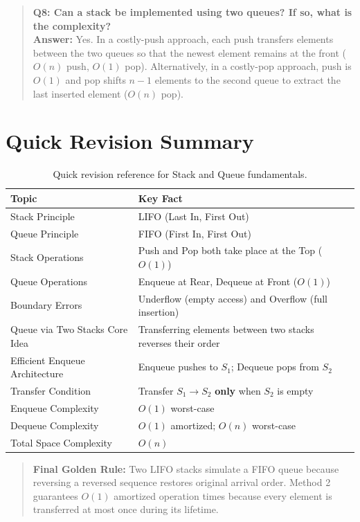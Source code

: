 \begin{quote}
\textbf{Q8: Can a stack be implemented using two queues? If so, what is the complexity?}\\
\textbf{Answer:} Yes. In a costly-push approach, each push transfers elements between the two queues so that the newest element remains at the front ($O(n)$ push, $O(1)$ pop). Alternatively, in a costly-pop approach, push is $O(1)$ and pop shifts $n-1$ elements to the second queue to extract the last inserted element ($O(n)$ pop).
\end{quote}

\section{Quick Revision Summary}

\begin{table}[htbp]
\centering
\small
\begin{tabularx}{\textwidth}{l X}
\toprule
\textbf{Topic} & \textbf{Key Fact} \\
\midrule
Stack Principle                & LIFO (Last In, First Out) \\
Queue Principle                & FIFO (First In, First Out) \\
Stack Operations               & Push and Pop both take place at the Top ($O(1)$) \\
Queue Operations               & Enqueue at Rear, Dequeue at Front ($O(1)$) \\
Boundary Errors                & Underflow (empty access) and Overflow (full insertion) \\
Queue via Two Stacks Core Idea & Transferring elements between two stacks reverses their order \\
Efficient Enqueue Architecture & Enqueue pushes to $S_1$; Dequeue pops from $S_2$ \\
Transfer Condition             & Transfer $S_1 \to S_2$ \textbf{only} when $S_2$ is empty \\
Enqueue Complexity             & $O(1)$ worst-case \\
Dequeue Complexity             & $O(1)$ amortized; $O(n)$ worst-case \\
Total Space Complexity         & $O(n)$ \\
\bottomrule
\end{tabularx}
\caption{Quick revision reference for Stack and Queue fundamentals.}
\end{table}

\begin{quote}
\textbf{Final Golden Rule:} Two LIFO stacks simulate a FIFO queue because reversing a reversed sequence restores original arrival order. Method 2 guarantees $O(1)$ amortized operation times because every element is transferred at most once during its lifetime.
\end{quote}


